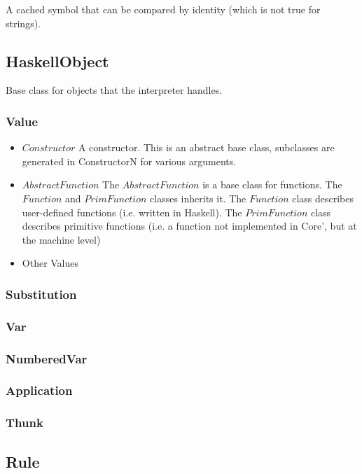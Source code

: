 A cached symbol that can be compared by identity (which is not true for strings).

\subsection*{HaskellObject}

Base class for objects that the interpreter handles.

\subsubsection*{Value}

\begin{itemize}
\item{$Constructor$} A constructor. This is an abstract base class, subclasses are 
generated in ConstructorN for various arguments.
\item{$AbstractFunction$} The $AbstractFunction$ is a base class for functions. The 
$Function$ and $PrimFunction$ classes inherits it. The $Function$ class describes
user-defined functions (i.e. written in Haskell). The $PrimFunction$ class describes
primitive functions (i.e. a function not implemented in Core', but at the machine level)
\item{Other Values}
\end{itemize}

\subsubsection*{Substitution}

\subsubsection*{Var}

\subsubsection*{NumberedVar}

\subsubsection*{Application}

\subsubsection*{Thunk}

\subsection*{Rule}

